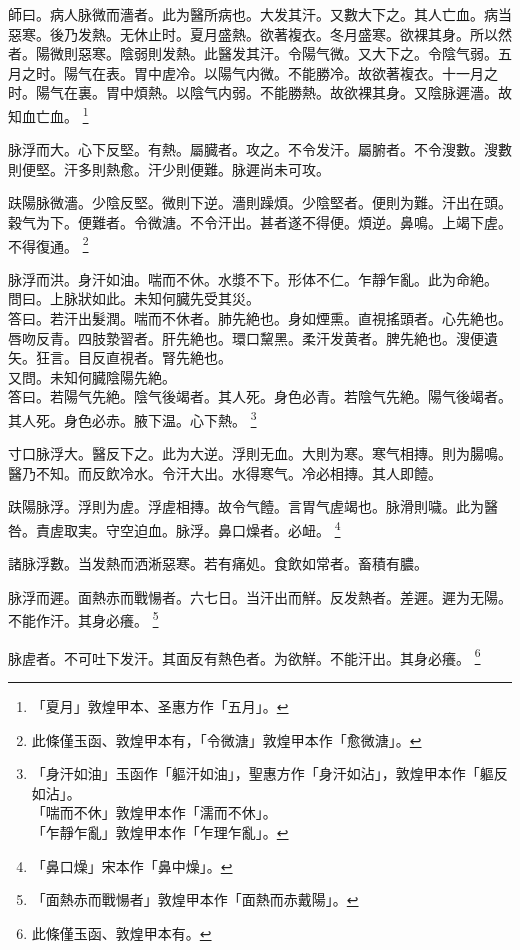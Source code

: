 \documentclass[12pt,twoside,UTF8,b5paper]{ctexbook}
\begin{document}
師曰。病人脉微而濇者。此为醫所病也。大发其汗。又數大下之。其人亡血。病当惡寒。後乃发熱。无休止时。夏月盛熱。欲著複衣。冬月盛寒。欲裸其身。所以然者。陽微則惡寒。陰弱則发熱。此醫发其汗。令陽气微。又大下之。令陰气弱。五月之时。陽气在表。胃中虗冷。以陽气内微。不能勝冷。故欲著複衣。十一月之时。陽气在裏。胃中煩熱。以陰气内弱。不能勝熱。故欲裸其身。又陰脉遲濇。故知血亡血。
	\footnote{「夏月」敦煌甲本、圣惠方作「五月」。}

脉浮而大。心下反堅。有熱。屬臓者。攻之。不令发汗。屬腑者。不令溲數。溲數則便堅。汗多則熱愈。汗少則便難。脉遲尚未可攻。

趺陽脉微濇。少陰反堅。微則下逆。濇則躁煩。少陰堅者。便則为難。汗出在頭。穀气为下。便難者。令微溏。不令汗出。甚者遂不得便。煩逆。鼻鳴。上竭下虗。不得復通。
	\footnote{此條僅玉函、敦煌甲本有，「令微溏」敦煌甲本作「愈微溏」。}

脉浮而洪。身汗如油。喘而不休。水漿不下。形体不仁。乍靜乍亂。此为命絶。\\
問曰。上脉狀如此。未知何臓先受其災。\\
答曰。若汗出髮潤。喘而不休者。肺先絶也。身如煙熏。直視搖頭者。心先絶也。唇吻反青。四肢漐習者。肝先絶也。環口黧黑。柔汗发黄者。脾先絶也。溲便遺矢。狂言。目反直視者。腎先絶也。\\
又問。未知何臓陰陽先絶。\\
答曰。若陽气先絶。陰气後竭者。其人死。身色必青。若陰气先絶。陽气後竭者。其人死。身色必赤。腋下温。心下熱。
	\footnote{「身汗如油」玉函作「軀汗如油」，聖惠方作「身汗如沾」，敦煌甲本作「軀反如沾」。\\「喘而不休」敦煌甲本作「濡而不休」。\\「乍靜乍亂」敦煌甲本作「乍理乍亂」。}

寸口脉浮大。醫反下之。此为大逆。浮則无血。大則为寒。寒气相摶。則为腸鳴。醫乃不知。而反飲冷水。令汗大出。水得寒气。冷必相摶。其人即饐。

趺陽脉浮。浮則为虗。浮虗相摶。故令气饐。言胃气虗竭也。脉滑則噦。此为醫咎。責虗取実。守空迫血。脉浮。鼻口燥者。必衄。
	\footnote{「鼻口燥」宋本作「鼻中燥」。}

諸脉浮數。当发熱而洒淅惡寒。若有痛処。食飲如常者。畜積有膿。

脉浮而遲。面熱赤而戰愓者。六七日。当汗出而觧。反发熱者。差遲。遲为无陽。不能作汗。其身必癢。
	\footnote{「面熱赤而戰愓者」敦煌甲本作「面熱而赤戴陽」。}

脉虗者。不可吐下发汗。其面反有熱色者。为欲觧。不能汗出。其身必癢。
	\footnote{此條僅玉函、敦煌甲本有。}
\end{document}
